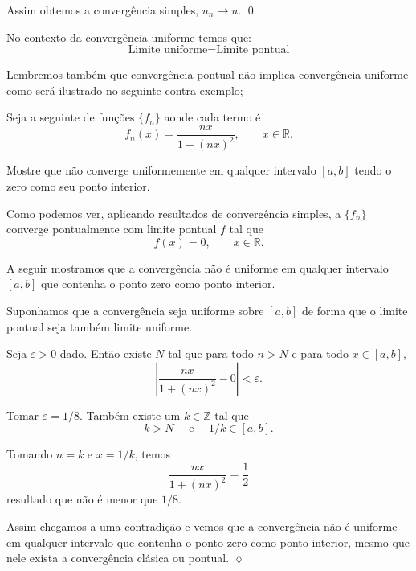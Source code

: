 Assim obtemos a converg\^encia simples, $u_n\to u$. \qed

No contexto da convergência uniforme temos que:
\begin{equation*}
    \text{Limite uniforme} = \text{Limite pontual}
\end{equation*}

Lembremos também que convergência pontual não implica convergência uniforme como será ilustrado no seguinte contra-exemplo;

\begin{exer}
Seja a seguinte \seq de funções $\{f_n\}$ aonde cada termo é
\begin{equation*}
    f_n(x)=\frac{nx}{1+(nx)^2},\qquad x\in \mathbb{R}.
\end{equation*}

Mostre que não converge uniformemente em qualquer intervalo
$[a,b]$ tendo o zero como seu ponto interior.
\end{exer}

\solo Como podemos ver, aplicando resultados de convergência
simples, a \seq $\{f_n\}$ converge pontualmente com limite pontual
$f$ tal que
\begin{equation*}
    f(x)=0,\qquad x\in \mathbb{R}.
\end{equation*}

A seguir mostramos que a convergência não é uniforme em qualquer
intervalo $[a,b]$ que contenha o ponto zero como ponto interior.

Suponhamos que a convergência seja uniforme sobre $[a,b]$ de forma
que o limite pontual seja também limite uniforme.

Seja $\varepsilon>0$ dado. Então existe $N$ tal que para todo $n>
N$ e para todo $x\in [a,b]$,
\begin{equation*}
    \left|\frac{nx}{1+(nx)^2}-0 \right|<\varepsilon.
\end{equation*}

Tomar $\varepsilon=1/8$. Também existe um $k\in \mathbb{Z}$  tal
que
\begin{equation*}
    k> N\quad \text{ e }\quad 1/k\in [a,b].
\end{equation*}

Tomando $n=k$ e $x=1/k$, temos
\begin{equation*}
    \frac{nx}{1+(nx)^2}=\frac{1}{2}
\end{equation*}
resultado que não é menor que $1/8$.

Assim chegamos a uma contradição e vemos que a convergência não é
uniforme em qualquer intervalo que contenha o ponto zero como
ponto interior, mesmo que nele exista a convergência clásica ou pontual. \hfill \(\lozenge\)

